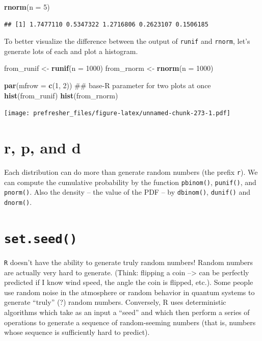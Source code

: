 \documentclass[]{book}
\newenvironment{Shaded}{\begin{snugshade}}{\end{snugshade}}
\newcommand{\KeywordTok}[1]{\textcolor[rgb]{0.13,0.29,0.53}{\textbf{#1}}}
\newcommand{\DataTypeTok}[1]{\textcolor[rgb]{0.13,0.29,0.53}{#1}}
\newcommand{\DecValTok}[1]{\textcolor[rgb]{0.00,0.00,0.81}{#1}}
\newcommand{\StringTok}[1]{\textcolor[rgb]{0.31,0.60,0.02}{#1}}
\newcommand{\NormalTok}[1]{#1}
\theoremstyle{definition}
\theoremstyle{definition}
\theoremstyle{definition}
\theoremstyle{remark}
\begin{document}
\begin{Shaded}
\begin{Highlighting}[]
\KeywordTok{rnorm}\NormalTok{(}\DataTypeTok{n =} \DecValTok{5}\NormalTok{)}
\end{Highlighting}
\end{Shaded}

\begin{verbatim}
## [1] 1.7477110 0.5347322 1.2716806 0.2623107 0.1506185
\end{verbatim}

To better visualize the difference between the output of \texttt{runif}
and \texttt{rnorm}, let's generate lots of each and plot a histogram.

\begin{Shaded}
\begin{Highlighting}[]
\NormalTok{from_runif <-}\StringTok{ }\KeywordTok{runif}\NormalTok{(}\DataTypeTok{n =} \DecValTok{1000}\NormalTok{)}
\NormalTok{from_rnorm <-}\StringTok{ }\KeywordTok{rnorm}\NormalTok{(}\DataTypeTok{n =} \DecValTok{1000}\NormalTok{)}

\KeywordTok{par}\NormalTok{(}\DataTypeTok{mfrow =} \KeywordTok{c}\NormalTok{(}\DecValTok{1}\NormalTok{, }\DecValTok{2}\NormalTok{)) ## base-R parameter for two plots at once}
\KeywordTok{hist}\NormalTok{(from_runif)}
\KeywordTok{hist}\NormalTok{(from_rnorm)}
\end{Highlighting}
\end{Shaded}

\texttt{[image: prefresher\_files/figure-latex/unnamed-chunk-273-1.pdf]}

\section{r, p, and d}\label{r-p-and-d}

Each distribution can do more than generate random numbers (the prefix
\texttt{r}). We can compute the cumulative probability by the function
\texttt{pbinom()}, \texttt{punif()}, and \texttt{pnorm()}. Also the
density -- the value of the PDF -- by \texttt{dbinom()},
\texttt{dunif()} and \texttt{dnorm()}.

\section{\texorpdfstring{\texttt{set.seed()}}{set.seed()}}\label{set.seed}

\texttt{R} doesn't have the ability to generate truly random numbers!
Random numbers are actually very hard to generate. (Think: flipping a
coin --\textgreater{} can be perfectly predicted if I know wind speed,
the angle the coin is flipped, etc.). Some people use random noise in
the atmosphere or random behavior in quantum systems to generate
``truly'' (?) random numbers. Conversely, R uses deterministic
algorithms which take as an input a ``seed'' and which then perform a
series of operations to generate a sequence of random-seeming numbers
(that is, numbers whose sequence is sufficiently hard to predict).
\end{document}
